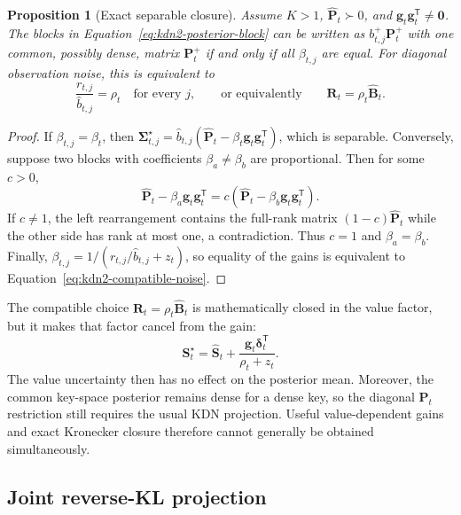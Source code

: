 \documentclass[11pt]{article}
\newcommand{\ve}[1]{\boldsymbol{#1}}
\newcommand{\tr}{\mathsf{T}}
\newtheorem{proposition}{Proposition}
\begin{document}
\begin{proposition}[Exact separable closure]
Assume $K>1$, $\widehat{\ve{P}}_t\succ0$, and
$\ve{g}_t\ve{g}_t^{\tr}\ne\ve{0}$.  The blocks in
Equation~\eqref{eq:kdn2-posterior-block} can be written as
$b_{t,j}^{+}\ve{P}_t^{+}$ with one common, possibly dense, matrix $\ve{P}_t^{+}$ if and only if
all $\beta_{t,j}$ are equal.  For diagonal observation noise, this is equivalent to
\begin{equation}
  \frac{r_{t,j}}{\widehat b_{t,j}}=\rho_t
  \quad\text{for every }j,
  \qquad\text{or equivalently}\qquad
  \ve{R}_t=\rho_t\widehat{\ve{B}}_t.
  \label{eq:kdn2-compatible-noise}
\end{equation}
\end{proposition}

\begin{proof}
If $\beta_{t,j}=\beta_t$, then
$\ve{\Sigma}_{t,j}^{\star}=\widehat b_{t,j}
(\widehat{\ve{P}}_t-\beta_t\ve{g}_t\ve{g}_t^{\tr})$, which is separable.  Conversely, suppose
two blocks with coefficients $\beta_a\ne\beta_b$ are proportional.  Then for some $c>0$,
\[
  \widehat{\ve{P}}_t-\beta_a\ve{g}_t\ve{g}_t^{\tr}
  =c(\widehat{\ve{P}}_t-\beta_b\ve{g}_t\ve{g}_t^{\tr}).
\]
If $c\ne1$, the left rearrangement contains the full-rank matrix
$(1-c)\widehat{\ve{P}}_t$ while the other side has rank at most one, a contradiction.  Thus
$c=1$ and $\beta_a=\beta_b$.  Finally,
$\beta_{t,j}=1/(r_{t,j}/\widehat b_{t,j}+z_t)$, so equality of the gains is equivalent to
Equation~\eqref{eq:kdn2-compatible-noise}.
\end{proof}

The compatible choice $\ve{R}_t=\rho_t\widehat{\ve{B}}_t$ is mathematically closed in the value
factor, but it makes that factor cancel from the gain:
\begin{equation}
  \ve{S}_t^{\star}
  =\widehat{\ve{S}}_t
   +\frac{\ve{g}_t\ve{\delta}_t^{\tr}}{\rho_t+z_t}.
  \label{eq:kdn2-compatible-mean}
\end{equation}
The value uncertainty then has no effect on the posterior mean.  Moreover, the common key-space
posterior remains dense for a dense key, so the diagonal $\ve{P}_t$ restriction still requires
the usual KDN projection.  Useful value-dependent gains and exact Kronecker closure therefore
cannot generally be obtained simultaneously.

\subsection{Joint reverse-KL projection}
\end{document}
